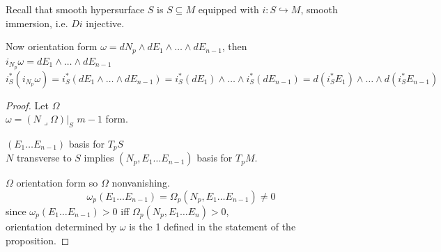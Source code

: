Recall that smooth hypersurface $S$ is $S\subseteq M$ equipped with $i: S \hookrightarrow M$, smooth immersion, i.e. $Di$ injective.  

Now orientation form $\omega = dN_p \wedge dE_1 \wedge \dots \wedge dE_{n-1}$, then \\
$i_{N_p} \omega  =dE_1 \wedge \dots \wedge dE_{n-1}$
\[
i^*_S (i_{N_p}\omega) = i^*_S (dE_1 \wedge \dots \wedge dE_{n-1}) = i^*_S(dE_1) \wedge \dots \wedge i^*_S(dE_{n-1}) = d(i^*_SE_1) \wedge \dots \wedge d(i_S^*E_{n-1})
\]



\begin{proof} Let $\Omega$ \\
\phantom{proof Let } $\omega  = \left. (N \lrcorner \Omega) \right|_S$ $m-1$ form.  

$(E_1 \dots E_{n-1}) $ basis for $T_pS$ \\
$N$ transverse to $S$ implies $(N_p, E_1 \dots E_{n-1})$ basis for $T_pM$.  

$\Omega$ orientation form so $\Omega$ nonvanishing.  
\[
\omega_p(E_1 \dots E_{n-1}) = \Omega_p(N_p, E_1 \dots E_{n-1}) \neq 0
\]
since $\omega_p(E_1 \dots E_{n-1}) >0$ iff $\Omega_p(N_p, E_1 \dots E_n) >0$,  \\
orientation determined by $\omega$ is the 1 defined in the statement of the proposition.  

\end{proof}
